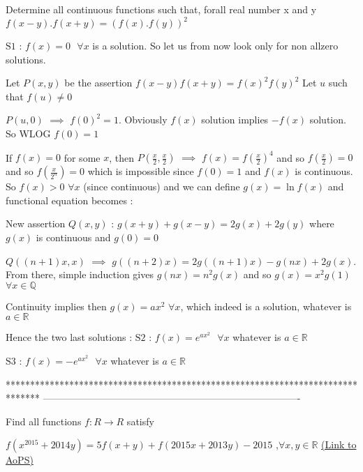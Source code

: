 \begin{solution}
	\begin{tcolorbox}Determine all continuous functions such that, forall real number x and y
$f(x-y).f(x+y)=(f(x).f(y))^2$\end{tcolorbox}
$\boxed{\text{S1 : }f(x)=0\text{   }\forall x}$ is a solution. So let us from now look only for non allzero solutions.

Let $P(x,y)$ be the assertion $f(x-y)f(x+y)=f(x)^2f(y)^2$
Let $u$ such that $f(u)\ne 0$

$P(u,0)$ $\implies$ $f(0)^2=1$. Obviously $f(x)$ solution implies $-f(x)$ solution. So WLOG $f(0)=1$

If $f(x)=0$ for some $x$, then $P(\frac x2,\frac x2)$ $\implies$ $f(x)=f(\frac x2)^4$ and so $f(\frac x2)=0$ and so $f(\frac x{2^n})=0$ which is impossible since $f(0)=1$ and $f(x)$ is continuous.
So $f(x)>0$ $\forall x$ (since continuous) and we can define $g(x)=\ln f(x)$ and functional equation becomes :

New assertion $Q(x,y)$ : $g(x+y)+g(x-y)=2g(x)+2g(y)$ where $g(x)$ is continuous and $g(0)=0$

$Q((n+1)x,x)$ $\implies$ $g((n+2)x)=2g((n+1)x)-g(nx)+2g(x)$. From there, simple induction gives $g(nx)=n^2g(x)$ and so $g(x)=x^2g(1)$ $\forall x\in\mathbb Q$

Continuity implies then $g(x)=ax^2$ $\forall x$, which indeed is a solution, whatever is $a\in\mathbb R$

Hence the two last solutions :
$\boxed{\text{S2 : }f(x)=e^{ax^2}\text{   }\forall x}$ whatever is $a\in\mathbb R$

$\boxed{\text{S3 : }f(x)=-e^{ax^2}\text{   }\forall x}$ whatever is $a\in\mathbb R$
\end{solution}
*******************************************************************************
-------------------------------------------------------------------------------

\begin{problem}
	Find all functions $ f: R \longrightarrow R$ satisfy

$f\left ( x^{2015}+2014y \right )=5f\left ( x+y \right )+f\left ( 2015x+2013y \right ) -2015$         ,$\forall x,y\in \mathbb{R}$
	\flushright \href{https://artofproblemsolving.com/community/c6h590377}{(Link to AoPS)}
\end{problem}



